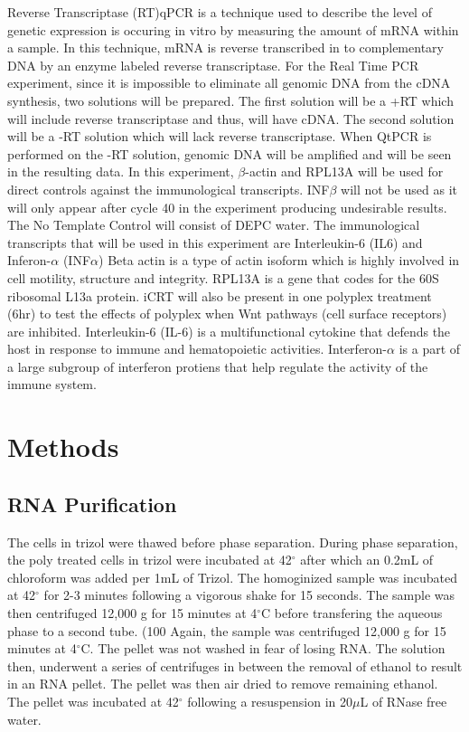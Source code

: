 \documentclass[journal, a4paper]{IEEEtran}
\begin{document}
  Reverse Transcriptase (RT)qPCR is a technique used to describe the level of genetic expression is occuring in vitro
  by measuring the amount of mRNA within a sample. In this technique, mRNA is reverse transcribed in to complementary DNA by
  an enzyme labeled reverse transcriptase.
  For the Real Time PCR experiment, since it is impossible to eliminate all genomic DNA from the cDNA synthesis, two solutions will be prepared.
  The first solution will be a +RT which will include reverse transcriptase and thus, will have cDNA.
  The second solution will be a -RT solution which will lack reverse transcriptase.
  When QtPCR is performed on the -RT solution, genomic DNA will be amplified and will be seen in the resulting data.
  In this experiment, $\beta$-actin and RPL13A will be used for direct controls against the immunological transcripts.
  INF$\beta$ will not be used as it will only appear after cycle 40 in the experiment producing undesirable results.
  The No Template Control will consist of DEPC water.
  The immunological transcripts that will be used in this experiment are Interleukin-6 (IL6) and Inferon-$\alpha$ (INF$\alpha$)
  Beta actin is a type of actin isoform which is highly involved in cell motility, structure and integrity.
  RPL13A is a gene that codes for the 60S ribosomal L13a protein. iCRT will also be present in one polyplex treatment (6hr)
  to test the effects of polyplex when Wnt pathways (cell surface receptors) are inhibited.
  Interleukin-6 (IL-6) is a multifunctional cytokine that defends the host in response to immune and hematopoietic activities.
  Interferon-$\alpha$ is a part of a large subgroup of interferon protiens that help regulate the activity of the immune system.

\section{Methods}
    \subsection{RNA Purification}
      The cells in trizol were thawed before phase separation. During phase separation,
      the poly treated cells in trizol were incubated at 42$^{\circ}$ after which an 0.2mL of chloroform was added per 1mL of Trizol.
      The homoginized sample was incubated at 42$^{\circ}$ for 2-3 minutes following a vigorous shake for 15 seconds.
      The sample was then centrifuged 12,000 g for 15 minutes at 4$^{\circ}$C before transfering the aqueous phase
      to a second tube. (100%
      Again, the sample was centrifuged 12,000 g for 15 minutes at 4$^{\circ}$C.
      The pellet was not washed in fear of losing RNA.
      The solution then, underwent a series of centrifuges in between the removal of ethanol to result in an RNA pellet.
      The pellet was then air dried to remove remaining ethanol.
      The pellet was incubated at 42$^{\circ}$ following a resuspension in 20$\mu$L of RNase free water.
\end{document}
